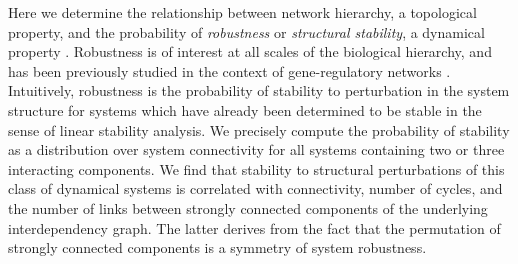 Here we determine the relationship between network hierarchy, a topological property, and the probability of \emph{robustness} or \emph{structural stability}, a dynamical property \cite{Smale1967}. Robustness is of interest at all scales of the biological hierarchy, and has been previously studied in the context of gene-regulatory networks \cite{WADDINGTON1942a,VanNimwegen1999,Siegal2002,Ciliberti2007b,Ciliberti2007,Wagner2013}. Intuitively, robustness is the probability of stability to perturbation in the system structure for systems which have already been determined to be stable in the sense of linear stability analysis. We precisely compute the probability of stability as a distribution over system connectivity for all systems containing two or three interacting components. We find that stability to structural perturbations of this class of dynamical systems is correlated with connectivity, number of cycles, and the number of links between strongly connected components of the underlying interdependency graph. The latter derives from the fact that the permutation of strongly connected components is a symmetry of system robustness.
